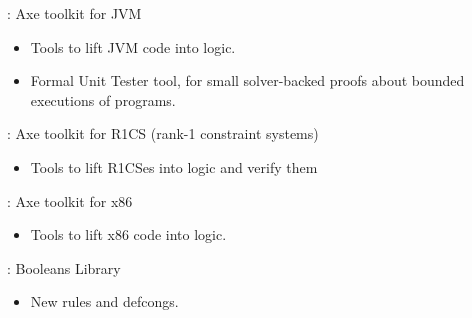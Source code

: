 \begin{frame}

\implibtitle

: Axe toolkit for JVM

\begin{itemize}

\item Tools to lift JVM code into logic.

\item Formal Unit Tester tool, for small solver-backed proofs about
bounded executions of programs.

\end{itemize}

\end{frame}


\begin{frame}

\implibtitle

: Axe toolkit for R1CS (rank-1 constraint systems)

\begin{itemize}

\item Tools to lift R1CSes into logic and verify them

\end{itemize}

\end{frame}


\begin{frame}

\implibtitle

: Axe toolkit for x86

\begin{itemize}

\item Tools to lift x86 code into logic.

\end{itemize}

\end{frame}


\begin{frame}

\implibtitle

: Booleans Library

\begin{itemize}

\item New rules and defcongs.

\end{itemize}

\end{frame}

